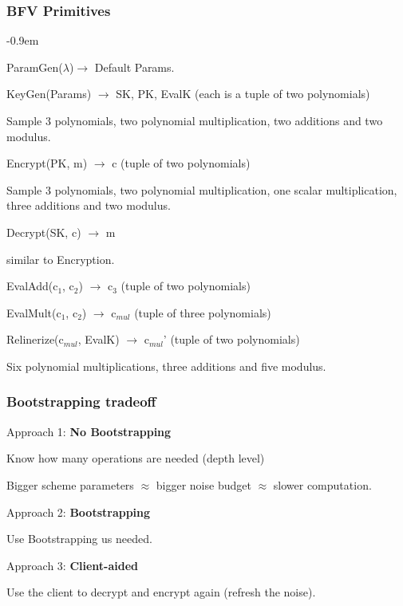 \documentclass[10pt,handout]{beamer}
\newcommand{\SubItem}[1]{
    {\setlength\itemindent{15pt} \item[-] #1}
}
\begin{document}
\begin{frame}
\frametitle{BFV Primitives}

\begin{itemize}\itemsep-0.9em
    \item ParamGen($\lambda$)$\rightarrow$ Default Params.
    \item KeyGen(Params) $\rightarrow$ SK, PK, EvalK (each is a tuple of two polynomials)
        \SubItem{ Sample 3 polynomials, two polynomial multiplication, two additions and two modulus.}
\pause
    \item Encrypt(PK, m) $\rightarrow$ c (tuple of two polynomials)
        \SubItem{ Sample 3 polynomials, two polynomial multiplication, one scalar multiplication, three additions and two modulus.}
    \item Decrypt(SK, c) $\rightarrow$ m
        \SubItem{ similar to Encryption.}
\pause
    \item EvalAdd(c$_1$, c$_2$) $\rightarrow$ c$_3$ (tuple of two polynomials)
    \item EvalMult(c$_1$, c$_2$) $\rightarrow$ c$_{mul}$ (tuple of three polynomials)
\pause
    \item Relinerize(c$_{mul}$, EvalK) $\rightarrow$ c$_{mul}$' (tuple of two polynomials)
        \SubItem{ Six polynomial multiplications, three additions and five modulus.}
\end{itemize}

\end{frame}




\begin{frame}
    \frametitle{Bootstrapping tradeoff}

    Approach 1: \textbf{No Bootstrapping}

    Know how many operations are needed (depth level)

    Bigger scheme parameters $\approx$ bigger noise budget $\approx$ slower computation.

\pause
    Approach 2: \textbf{Bootstrapping}

    Use Bootstrapping us needed.

\pause
    Approach 3: \textbf{Client-aided}

    Use the client to decrypt and encrypt again (refresh the noise).
\end{frame}
\end{document}
